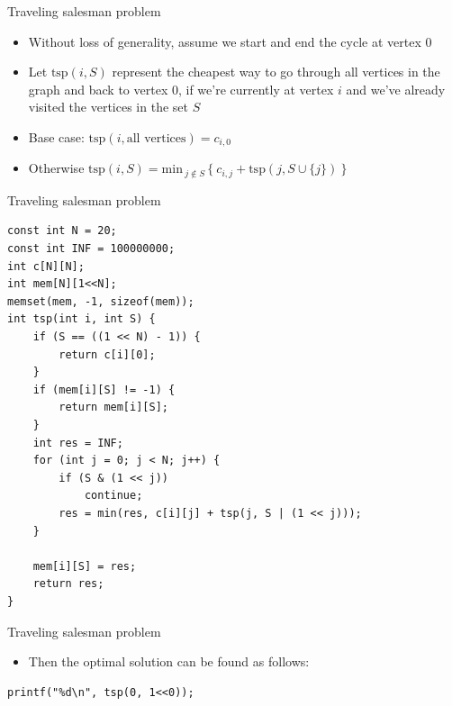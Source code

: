 \documentclass{beamer}
\begin{document}
\begin{frame}[plain]{Traveling salesman problem}
    \vspace{20pt}
    \begin{itemize}
\item Without loss of generality, assume we start and end the cycle at vertex $0$
    \vspace{10pt}

\item Let $\mathrm{tsp}(i, S)$ represent the cheapest way to go through all vertices in the graph and back to vertex $0$, if we're currently at vertex $i$ and we've already visited the vertices in the set $S$

    \vspace{20pt}
\item Base case: $\mathrm{tsp}(i, \textrm{all vertices}) = c_{i,0}$
\item Otherwise $\mathrm{tsp}(i, S) = \mathrm{min}_{\ j \not\in S\ } \{\ c_{i,j} + \mathrm{tsp}(j, S \cup \{j\})\ \}$
    \end{itemize}
\end{frame}

\begin{frame}{Traveling salesman problem}
    \begin{verbatim}
const int N = 20;
const int INF = 100000000;
int c[N][N];
int mem[N][1<<N];
memset(mem, -1, sizeof(mem));
int tsp(int i, int S) {
    if (S == ((1 << N) - 1)) {
        return c[i][0];
    }
    if (mem[i][S] != -1) {
        return mem[i][S];
    }
    int res = INF;
    for (int j = 0; j < N; j++) {
        if (S & (1 << j))
            continue;
        res = min(res, c[i][j] + tsp(j, S | (1 << j)));
    }

    mem[i][S] = res;
    return res;
}
    \end{verbatim}
\end{frame}

\begin{frame}{Traveling salesman problem}
    \vspace{30pt}
    \begin{itemize}
\item Then the optimal solution can be found as follows:
    \end{itemize}

    \vspace{20pt}
    \begin{verbatim}
printf("%d\n", tsp(0, 1<<0));
    \end{verbatim}
\end{frame}
\end{document}
